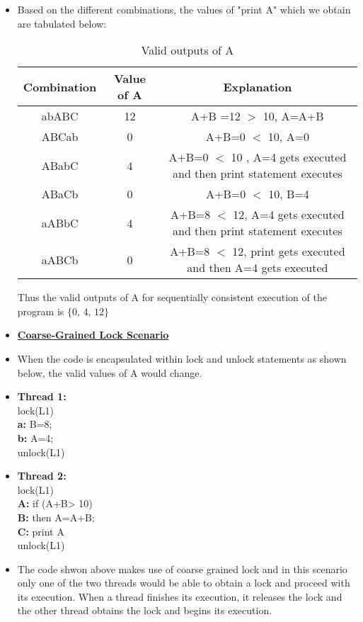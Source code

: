 \documentclass[11pt]{article}
\begin{document}
\begin{itemize}
	\newpage
	\item[] Based on the different combinations, the values of "print A" which we obtain are tabulated below:
	
	\begin{table}[h]
		\centering
		\begin{tabular}{|c|c|c|}
			\hline
			\textbf{Combination }  & \textbf{Value of A} & \textbf{Explanation}  \\
			\hline
			abABC & 12  & A+B =12 $>$ 10, A=A+B\\
			\hline
			ABCab & 0 & A+B=0 $<$ 10, A=0 \\
			\hline
			ABabC & 4 & A+B=0 $<$ 10 , A=4 gets executed and then print statement executes \\
			\hline
			ABaCb& 0 & A+B=0 $<$ 10, B=4  \\
			\hline
			aABbC & 4 & A+B=8 $<$ 12, A=4 gets executed and then print statement executes\\
			\hline  
			aABCb & 0 & A+B=8 $<$ 12, print gets executed and then A=4 gets executed \\ \hline 
		\end{tabular}
		\caption{Valid outputs of A}
		\label{t2}
	\end{table}
	
Thus the valid outputs of A for sequentially consistent execution of the program is \textbf{$\boxed{\{\text{0, 4, 12}\}}$}


\item[] \textbf{\underline{ Coarse-Grained Lock Scenario}}

\item[] When the code is encapsulated within lock and unlock statements as shown below, the valid values of A would change.

\item[]  \textbf{Thread 1:}\\
lock(L1) \\
\textbf{a:} B=8;    \\
\textbf{b:} A=4; \\
unlock(L1)

\item[] \textbf{Thread 2:}\\
lock(L1) \\
\textbf{A:} if (A+B> 10)\\
\textbf{B:} then A=A+B;\\
\textbf{C:} print A \\
unlock(L1)


\item[] The code shwon above makes use of coarse grained lock and in this scenario only one of the two threads would be able to obtain a lock and proceed with its execution. When a thread finishes its execution, it releases the lock and the other thread obtains the lock and begins its execution.


\end{itemize}
\end{document}
